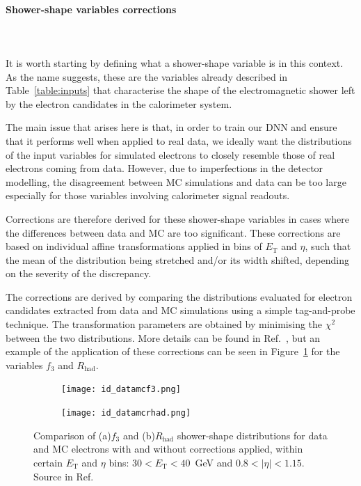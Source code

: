 \paragraph{Shower-shape variables corrections} \mbox{}\\
\\
It is worth starting by defining what a shower-shape variable is in this context. As the name suggests, these are the variables already described in Table~\ref{table:inputs} that characterise the shape of the electromagnetic shower left by the electron candidates in the calorimeter system.

The main issue that arises here is that, in order to train our DNN and ensure that it performs well when applied to real data, we ideally want the distributions of the input variables for simulated electrons to closely resemble those of real electrons coming from data. However, due to imperfections in the detector modelling, the disagreement between MC simulations and data can be too large especially for those variables involving calorimeter signal readouts. %

Corrections are therefore derived for these shower-shape variables in cases where the differences between data and MC are too significant. These corrections are based on individual affine transformations applied in bins of $E_{\text{T}}$ and $\eta$, such that the mean of the distribution being stretched and/or its width shifted, depending on the severity of the discrepancy.

The corrections are derived by comparing the distributions evaluated for \zee electron candidates extracted from data and MC simulations using a simple tag-and-probe technique. The transformation parameters are obtained by minimising the $\chi^2$ between the two distributions. More details can be found in Ref.~\cite{Aaboud:2657964}, but an example of the application of these corrections can be seen in Figure~\ref{fig:corrected} for the variables $f_{3}$ and $R_{\text{had}}$.


\begin{figure}[htbp]
  \centering
  \begin{subfigure}[b]{0.48\textwidth}
      \texttt{[image: id\_datamcf3.png]}
      \caption{}
  \end{subfigure}
  \hfill
  \begin{subfigure}[b]{0.48\textwidth}
      \texttt{[image: id\_datamcrhad.png]}
      \caption{}
  \end{subfigure}
  \hfill
  \caption{Comparison of (a)$f_{3}$ and (b)$R_{\text{had}}$ shower-shape distributions for data and MC electrons with and without corrections applied, within certain $E_{\text{T}}$ and $\eta$ bins: $30 < E_{\text{T}} < 40$~GeV and $0.8<|\eta|<1.15$. Source in Ref.~\cite{Aaboud:2657964}}
  \label{fig:corrected}
\end{figure}

